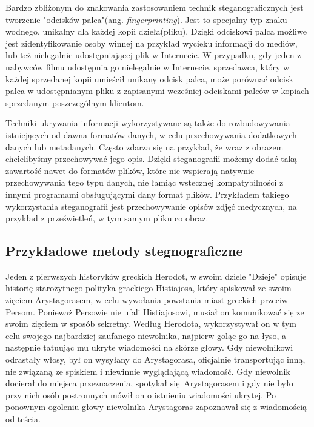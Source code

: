 \documentclass[a4paper, twoside]{report}
\begin{document}
        Bardzo zbliżonym do znakowania zastosowaniem technik steganograficznych jest
        tworzenie "odcisków palca"(ang. \emph{fingerprinting}). Jest to specjalny
        typ znaku wodnego, unikalny dla każdej kopii dzieła(pliku). Dzięki odciskowi
        palca możliwe jest zidentyfikowanie osoby winnej na przykład wycieku informacji
        do mediów, lub też nielegalnie udostępniającej plik w Internecie. W przypadku,
        gdy jeden z nabywców filmu udostępnia go nielegalnie w Internecie, sprzedawca,
        który w każdej sprzedanej kopii umieścił unikany odcisk palca, może porównać
        odcisk palca w udostępnianym pliku z zapisanymi wcześniej odciskami palców
        w kopiach sprzedanym poszczególnym klientom.

        Techniki ukrywania informacji wykorzystywane są także do rozbudowywania
        istniejących od dawna formatów danych, w celu przechowywania dodatkowych
        danych lub metadanych. Często zdarza się na przykład, że wraz z obrazem
        chcielibyśmy przechowywać jego opis. Dzięki steganografii możemy dodać
        taką zawartość nawet do formatów plików, które nie wspierają natywnie
        przechowywania tego typu danych, nie łamiąc wstecznej kompatybilności z innymi
        programami obsługującymi dany format plików. Przykładem takiego wykorzystania
        steganografii jest przechowywanie opisów zdjęć medycznych, na przykład
        z prześwietleń, w tym samym pliku co obraz.\cite{DISAPPEARINGCRYPTOEMBEDDINGMETDATA}

        \subsection{Przykładowe metody stegnograficzne}
        Jeden z pierwszych historyków greckich Herodot, w swoim dziele "Dzieje"
        opisuje historię starożytnego polityka grackiego Histiajosa, który spiskował
        ze swoim zięciem Arystagorasem, w celu wywołania powstania miast greckich
        przeciw Persom\cite{STEGANOGRAPHYINTRO}. Ponieważ Persowie nie ufali Histiajosowi, musiał on komunikować
        się ze swoim zięciem w sposób sekretny. Według Herodota, wykorzystywał
        on w tym celu swojego najbardziej zaufanego niewolnika, najpierw goląc
        go na łyso, a następnie tatuując mu ukryte wiadomości na skórze głowy.
        Gdy niewolnikowi odrastały włosy, był on wysyłany do Arystagorasa, oficjalnie
        transportując inną, nie związaną ze spiskiem i niewinnie wyglądającą wiadomość.
        Gdy niewolnik docierał do miejsca przeznaczenia, spotykał się Arystagorasem i
        gdy nie było przy nich osób postronnych mówił on o istnieniu wiadomości ukrytej.
        Po ponownym ogoleniu głowy niewolnika Arystagoras zapoznawał się z wiadomością
        od teścia.
\end{document}

